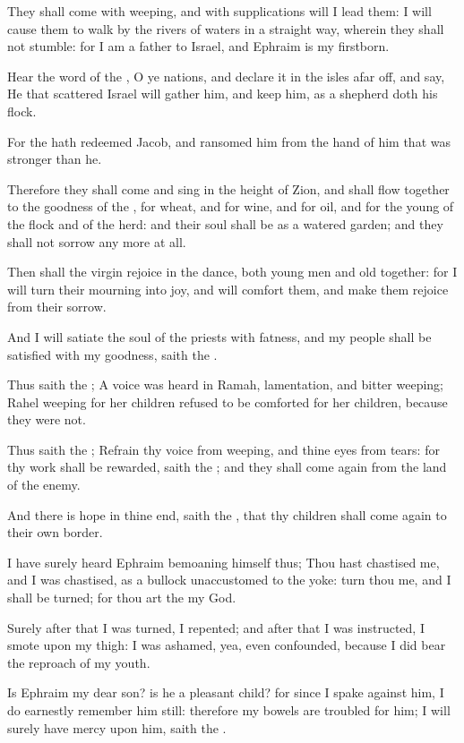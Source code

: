 \verse They shall come with weeping, and with supplications will I lead them: I will cause them to walk by the rivers of waters in a straight way, wherein they shall not stumble: for I am a father to Israel, and Ephraim is my firstborn.

\verse Hear the word of the \LORD, O ye nations, and declare it in the isles afar off, and say, He that scattered Israel will gather him, and keep him, as a shepherd doth his flock.

\verse For the \LORD hath redeemed Jacob, and ransomed him from the hand of him that was stronger than he.

\verse Therefore they shall come and sing in the height of Zion, and shall flow together to the goodness of the \LORD, for wheat, and for wine, and for oil, and for the young of the flock and of the herd: and their soul shall be as a watered garden; and they shall not sorrow any more at all.

\verse Then shall the virgin rejoice in the dance, both young men and old together: for I will turn their mourning into joy, and will comfort them, and make them rejoice from their sorrow.

\verse And I will satiate the soul of the priests with fatness, and my people shall be satisfied with my goodness, saith the \LORD.

\verse Thus saith the \LORD; A voice was heard in Ramah, lamentation, and bitter weeping; Rahel weeping for her children refused to be comforted for her children, because they were not.

\verse Thus saith the \LORD; Refrain thy voice from weeping, and thine eyes from tears: for thy work shall be rewarded, saith the \LORD; and they shall come again from the land of the enemy.

\verse And there is hope in thine end, saith the \LORD, that thy children shall come again to their own border.

\verse I have surely heard Ephraim bemoaning himself thus; Thou hast chastised me, and I was chastised, as a bullock unaccustomed to the yoke: turn thou me, and I shall be turned; for thou art the \LORD my God.

\verse Surely after that I was turned, I repented; and after that I was instructed, I smote upon my thigh: I was ashamed, yea, even confounded, because I did bear the reproach of my youth.

\verse Is Ephraim my dear son? is he a pleasant child? for since I spake against him, I do earnestly remember him still: therefore my bowels are troubled for him; I will surely have mercy upon him, saith the \LORD.

